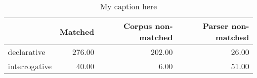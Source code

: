 \begin{table}[!ht]
\centering
\begin{tabular}{lrrr}
\toprule
{} &  Matched &  Corpus non-matched &  Parser non-matched \\
\midrule
declarative   &   276.00 &              202.00 &               26.00 \\
interrogative &    40.00 &                6.00 &               51.00 \\
\bottomrule
\end{tabular}
\caption{My caption here}
\label{tab:INDICATIVE-ocd-data}
\end{table}